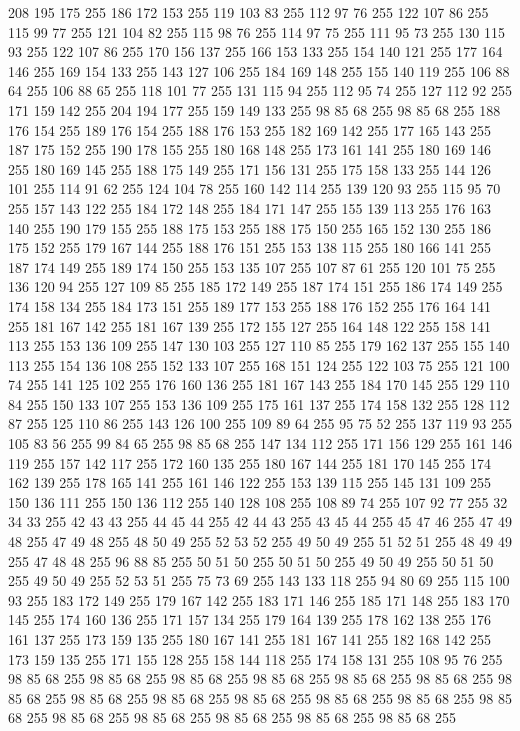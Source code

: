 208 195 175 255 186 172 153 255 119 103 83 255 112 97 76 255 122 107 86 255 115 99 77 255 121 104 82 255 115 98 76 255 114 97 75 255 111 95 73 255 130 115 93 255 122 107 86 255 170 156 137 255 166 153 133 255 154 140 121 255 177 164 146 255 169 154 133 255 143 127 106 255 184 169 148 255 155 140 119 255 106 88 64 255 106 88 65 255 118 101 77 255 131 115 94 255 112 95 74 255 127 112 92 255 171 159 142 255 204 194 177 255 159 149 133 255 98 85 68 255 98 85 68 255 188 176 154 255 189 176 154 255 188 176 153 255 182 169 142 255 177 165 143 255 187 175 152 255 190 178 155 255 180 168 148 255 173 161 141 255 180 169 146 255 180 169 145 255 188 175 149 255 171 156 131 255 175 158 133 255 144 126 101 255 114 91 62 255 124 104 78 255 160 142 114 255 139 120 93 255 115 95 70 255 157 143 122 255 184 172 148 255 184 171 147 255 155 139 113 255 176 163 140 255 190 179 155 255 188 175 153 255 188 175 150 255 165 152 130 255 186 175 152 255 179 167 144 255 188 176 151 255 153 138 115 255
180 166 141 255 187 174 149 255 189 174 150 255 153 135 107 255 107 87 61 255 120 101 75 255 136 120 94 255 127 109 85 255 185 172 149 255 187 174 151 255 186 174 149 255 174 158 134 255 184 173 151 255 189 177 153 255 188 176 152 255 176 164 141 255 181 167 142 255 181 167 139 255 172 155 127 255 164 148 122 255 158 141 113 255 153 136 109 255 147 130 103 255 127 110 85 255 179 162 137 255 155 140 113 255 154 136 108 255 152 133 107 255 168 151 124 255 122 103 75 255 121 100 74 255 141 125 102 255 176 160 136 255 181 167 143 255 184 170 145 255 129 110 84 255 150 133 107 255 153 136 109 255 175 161 137 255 174 158 132 255 128 112 87 255 125 110 86 255 143 126 100 255 109 89 64 255 95 75 52 255 137 119 93 255 105 83 56 255 99 84 65 255 98 85 68 255 147 134 112 255 171 156 129 255 161 146 119 255 157 142 117 255 172 160 135 255 180 167 144 255 181 170 145 255 174 162 139 255 178 165 141 255 161 146 122 255 153 139 115 255 145 131 109 255 150 136 111 255 150 136 112 255 140 128 108 255
108 89 74 255 107 92 77 255 32 34 33 255 42 43 43 255 44 45 44 255 42 44 43 255 43 45 44 255 45 47 46 255 47 49 48 255 47 49 48 255 48 50 49 255 52 53 52 255 49 50 49 255 51 52 51 255 48 49 49 255 47 48 48 255 96 88 85 255 50 51 50 255 50 51 50 255 49 50 49 255 50 51 50 255 49 50 49 255 52 53 51 255 75 73 69 255 143 133 118 255 94 80 69 255 115 100 93 255 183 172 149 255 179 167 142 255 183 171 146 255 185 171 148 255 183 170 145 255 174 160 136 255 171 157 134 255 179 164 139 255 178 162 138 255 176 161 137 255 173 159 135 255 180 167 141 255 181 167 141 255 182 168 142 255 173 159 135 255 171 155 128 255 158 144 118 255 174 158 131 255 108 95 76 255 98 85 68 255 98 85 68 255 98 85 68 255 98 85 68 255 98 85 68 255 98 85 68 255 98 85 68 255 98 85 68 255 98 85 68 255 98 85 68 255 98 85 68 255 98 85 68 255 98 85 68 255 98 85 68 255 98 85 68 255 98 85 68 255 98 85 68 255 98 85 68 255
